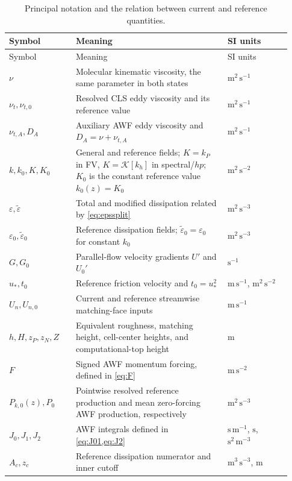 \documentclass[11pt,a4paper]{article}
\numberwithin{equation}{section}
\newcommand{\eps}{\varepsilon}
\newcommand{\et}{\widetilde{\varepsilon}}
\newcommand{\nut}{\nu_t}
\newcommand{\ust}{u_*}
\newcommand{\Aref}{A_c}
\newcommand{\ycut}{z_c}
\begin{document}
\begingroup\small
\begin{longtable}{@{}>{\raggedright\arraybackslash}p{0.22\linewidth}>{\raggedright\arraybackslash}p{0.50\linewidth}>{\raggedright\arraybackslash}p{0.21\linewidth}@{}}
\caption{Principal notation and the relation between current and reference quantities.}
\label{tab:notation}\\
\toprule
Symbol & Meaning & SI units\\
\midrule
\endfirsthead
\toprule Symbol & Meaning & SI units\\ \midrule
\endhead
$\nu$ & Molecular kinematic viscosity, the same parameter in both states
& $\mathrm{m^2\,s^{-1}}$\\
$\nut,\nu_{t,0}$ & Resolved CLS eddy viscosity and its reference value
& $\mathrm{m^2\,s^{-1}}$\\
$\nu_{t,A},D_A$ & Auxiliary AWF eddy viscosity and $D_A=\nu+\nu_{t,A}$
& $\mathrm{m^2\,s^{-1}}$\\
$k,k_0,K,K_0$ & General and reference fields; $K=k_P$ in FV,
$K=\mathcal K[k_h]$ in spectral/$hp$; $K_0$ is the constant
reference value $k_0(z)=K_0$
& $\mathrm{m^2\,s^{-2}}$\\
$\eps,\et$ & Total and modified dissipation related by \cref{eq:epssplit}
& $\mathrm{m^2\,s^{-3}}$\\
$\eps_0,\et_0$ & Reference dissipation fields; $\et_0=\eps_0$ for constant $k_0$
& $\mathrm{m^2\,s^{-3}}$\\
$G,G_0$ & Parallel-flow velocity gradients $U'$ and $U_0'$
& $\mathrm{s^{-1}}$\\
$\ust,t_0$ & Reference friction velocity and $t_0=\ust^2$
& $\mathrm{m\,s^{-1}}$, $\mathrm{m^2\,s^{-2}}$\\
$U_n,U_{n,0}$ & Current and reference streamwise matching-face inputs
& $\mathrm{m\,s^{-1}}$\\
$h,H,z_P,z_N,Z$ & Equivalent roughness, matching height, cell-center heights,
and computational-top height & $\mathrm m$\\
$F$ & Signed AWF momentum forcing, defined in \cref{eq:F}
& $\mathrm{m\,s^{-2}}$\\
$P_{k,0}(z),P_0$ & Pointwise resolved reference production and mean
zero-forcing AWF production, respectively & $\mathrm{m^2\,s^{-3}}$\\
$J_0,J_1,J_2$ & AWF integrals defined in \cref{eq:J01,eq:J2}
& $\mathrm{s\,m^{-1}}$, $\mathrm s$, $\mathrm{s^2\,m^{-3}}$\\
$\Aref,\ycut$ & Reference dissipation numerator and inner cutoff
& $\mathrm{m^3\,s^{-3}}$, $\mathrm m$\\

\end{longtable}
\end{document}
